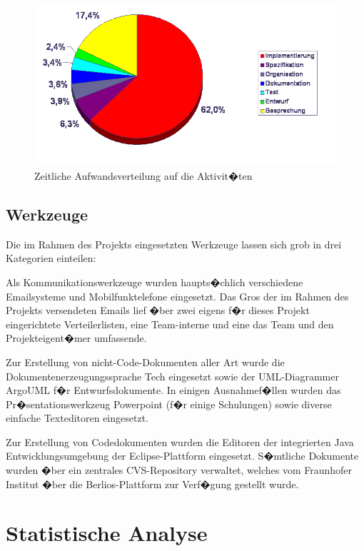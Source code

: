 \documentclass[a4paper,titlepage,12pt,ngerman]{scrbook}
\begin{document}
\begin{figure}[h!]
  \centering
  \includegraphics[width=12.5cm]{praesentation/aufwand_pro_phase}
  \caption{Zeitliche Aufwandsverteilung auf die Aktivit�ten}
\end{figure}


\section{Werkzeuge}

Die im Rahmen des Projekts eingesetzten Werkzeuge lassen sich grob in drei Kategorien
einteilen:\par

Als Kommunikationswerkzeuge wurden haupts�chlich verschiedene Emailsysteme und 
Mobilfunktelefone eingesetzt. Das Gros der im Rahmen des Projekts versendeten
Emails lief �ber zwei eigens f�r dieses Projekt eingerichtete Verteilerlisten,
eine Team-interne und eine das Team und den Projekteigent�mer umfassende.\par

Zur Erstellung von nicht-Code-Dokumenten aller Art wurde die Dokumentenerzeugungssprache
Tech eingesetzt sowie der UML-Diagrammer ArgoUML f�r Entwurfsdokumente. In einigen
Ausnahmef�llen wurden das Pr�sentationswerkzeug Powerpoint (f�r einige Schulungen) sowie
diverse einfache Texteditoren eingesetzt.\par

Zur Erstellung von Codedokumenten wurden die Editoren der integrierten Java Entwicklungsumgebung 
der Eclipse-Plattform eingesetzt. S�mtliche Dokumente wurden �ber ein zentrales CVS-Repository 
verwaltet, welches vom Fraunhofer Institut �ber die Berlios-Plattform zur Verf�gung gestellt wurde.

\chapter{Statistische Analyse}
\end{document}

